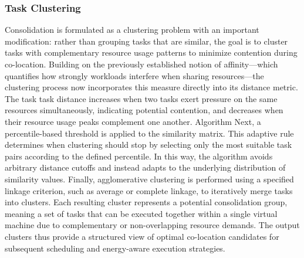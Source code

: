 \subsubsection{Task Clustering}
\label{sec:task_clustering}
Consolidation is formulated as a clustering problem with an important modification: rather than grouping tasks that are similar, the goal is to cluster tasks with complementary resource usage patterns to minimize contention during co-location. Building on the previously established notion of affinity—which quantifies how strongly workloads interfere when sharing resources—the clustering process now incorporates this measure directly into its distance metric. The task task distance increases when two tasks exert pressure on the same resources simultaneously, indicating potential contention, and decreases when their resource usage peaks complement one another.
Algorithm %
Next, a percentile-based threshold is applied to the similarity matrix. This adaptive rule determines when clustering should stop by selecting only the most suitable task pairs according to the defined percentile. In this way, the algorithm avoids arbitrary distance cutoffs and instead adapts to the underlying distribution of similarity values.
Finally, agglomerative clustering is performed using a specified linkage criterion, such as average or complete linkage, to iteratively merge tasks into clusters. Each resulting cluster represents a potential consolidation group, meaning a set of tasks that can be executed together within a single virtual machine due to complementary or non-overlapping resource demands. The output clusters thus provide a structured view of optimal co-location candidates for subsequent scheduling and energy-aware execution strategies.

